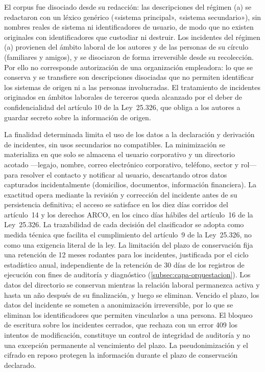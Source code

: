 El corpus fue disociado desde su redacción: las descripciones del régimen (a) se redactaron con un léxico genérico («sistema principal», «sistema secundario»), sin nombres reales de sistema ni identificadores de usuario, de modo que no existen originales con identificadores que custodiar ni destruir. Los incidentes del régimen (a) provienen del ámbito laboral de los autores y de las personas de su círculo (familiares y amigos), y se disociaron de forma irreversible desde su recolección. Por ello no corresponde autorización de una organización empleadora: lo que se conserva y se transfiere son descripciones disociadas que no permiten identificar los sistemas de origen ni a las personas involucradas. El tratamiento de incidentes originados en ámbitos laborales de terceros queda alcanzado por el deber de confidencialidad del artículo 10 de la Ley~25.326, que obliga a los autores a guardar secreto sobre la información de origen.

La finalidad determinada limita el uso de los datos a la declaración y derivación de incidentes, sin usos secundarios no compatibles. La minimización se materializa en que solo se almacena el usuario corporativo y un directorio acotado ---legajo, nombre, correo electrónico corporativo, teléfono, sector y rol--- para resolver el contacto y notificar al usuario, descartando otros datos capturados incidentalmente (domicilios, documentos, información financiera). La exactitud opera mediante la revisión y corrección del incidente antes de su persistencia definitiva; el acceso se satisface en los diez días corridos del artículo~14 y los derechos ARCO, en los cinco días hábiles del artículo~16 de la Ley~25.326. La trazabilidad de cada decisión del clasificador se adopta como medida técnica que facilita el cumplimiento del artículo~9 de la Ley~25.326, no como una exigencia literal de la ley. La limitación del plazo de conservación fija una retención de 12 meses rodantes para los incidentes, justificada por el ciclo estadístico anual, independiente de la retención de 30 días de los registros de ejecución con fines de auditoría y diagnóstico (\autoref{subsec:capa-orquestacion}). Los datos del directorio se conservan mientras la relación laboral permanezca activa y hasta un año después de su finalización, y luego se eliminan. Vencido el plazo, los datos del incidente se someten a anonimización irreversible, por lo que se eliminan los identificadores que permiten vincularlos a una persona. El bloqueo de escritura sobre los incidentes cerrados, que rechaza con un error 409 los intentos de modificación, constituye un control de integridad de auditoría y no una excepción permanente al vencimiento del plazo. La pseudonimización y el cifrado en reposo protegen la información durante el plazo de conservación declarado.

